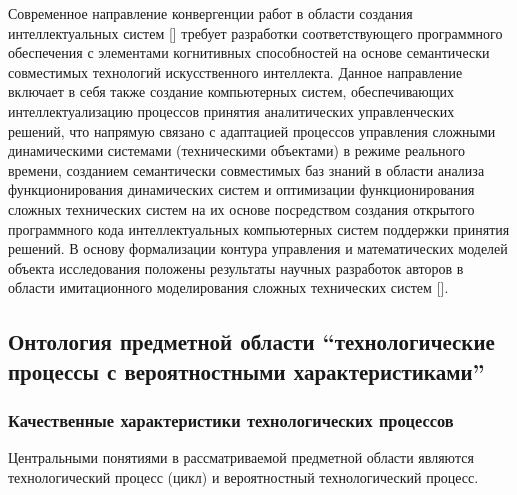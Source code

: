 Современное направление конвергенции работ в области создания интеллектуальных систем [] требует разработки соответствующего программного обеспечения с элементами когнитивных способностей на основе семантически совместимых технологий искусственного интеллекта. Данное направление включает в себя также создание компьютерных систем, обеспечивающих интеллектуализацию процессов принятия аналитических управленческих решений, что напрямую связано с адаптацией процессов управления сложными динамическими системами (техническими объектами) в режиме реального времени, созданием семантически совместимых баз знаний в области анализа функционирования динамических систем и оптимизации функционирования сложных технических систем на их основе посредством создания открытого программного кода интеллектуальных компьютерных систем поддержки принятия решений.
В основу формализации контура управления и математических моделей объекта исследования положены результаты научных разработок авторов в области имитационного моделирования сложных технических систем [].

\subsection{Онтология предметной области ``технологические процессы с вероятностными характеристиками''}

\subsubsection{Качественные характеристики технологических процессов}

Центральными понятиями в рассматриваемой предметной области являются технологический процесс (цикл) и вероятностный технологический процесс.

\begin{SCn}
\end{SCn}

\begin{SCn}
\end{SCn}


